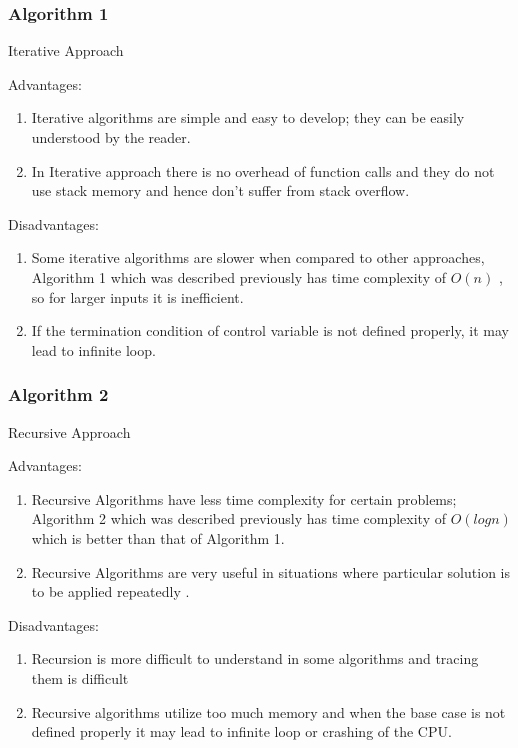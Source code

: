 \documentclass[12pt, a4paper]{article}
\begin{document}
\subsubsection{Algorithm 1}
Iterative Approach

Advantages:
\begin{enumerate}
	\item {Iterative algorithms are simple and easy to develop; they can be easily understood by the reader.}
	\item {In Iterative approach there is no overhead of function calls and they do not use stack memory and hence don’t suffer from stack overflow.}
	          
\end{enumerate}

Disadvantages:
\begin{enumerate}
	\item {Some iterative algorithms are slower when compared to other approaches, Algorithm 1 which was described previously has time complexity of $O(n)$ , so for larger inputs it is inefficient.}
	\item {If the termination condition of control variable is not defined properly, it may lead to infinite loop.}
	          
\end{enumerate}
\newpage
\subsubsection{Algorithm 2}
Recursive Approach 

Advantages:
\begin{enumerate}
	\item {Recursive Algorithms have less time complexity for certain problems;  Algorithm 2 which was described previously has time complexity of $O(logn)$ which is better than that of Algorithm 1.}
	\item {Recursive Algorithms are very useful in situations where particular solution is to be applied repeatedly \cite{Advantages and Disadvantages of Recursion}.}
	          
\end{enumerate}

Disadvantages:
\begin{enumerate}
	\item {Recursion is more difficult to understand in some algorithms and tracing them is difficult}
	\item {Recursive algorithms utilize too much memory and when the base case is not defined properly it may lead to infinite loop or crashing of the CPU.}
	          
\end{enumerate}
\end{document}
